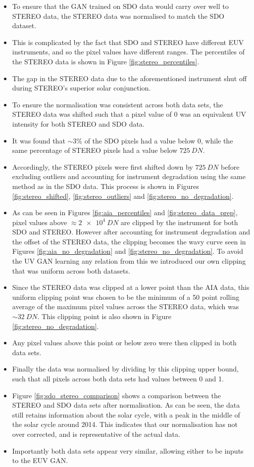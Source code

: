 \documentclass[11pt,a4paper,onecolumn]{report}
\begin{document}
\begin{itemize}
  \item To ensure that the GAN trained on SDO data would carry over well to
  STEREO data, the STEREO data was normalised to match the SDO dataset.
  \item This is complicated by the fact that SDO and STEREO have different EUV
  instruments, and so the pixel values have different ranges. The percentiles of
  the STEREO data is shown in Figure \ref{fig:stereo_percentiles}.
  \item The gap in the STEREO data due to the aforementioned instrument shut off
  during STEREO's superior solar conjunction.
  \item To ensure the normalisation was consistent across both data sets,
  the STEREO data was shifted such that a pixel value of 0 was an equivalent UV
  intensity for both STEREO and SDO data.
  \item It was found that $\sim 3 \%$ of the SDO pixels had a value below 0,
  while the same percentage of STEREO pixels had a value below $\SI[]{725}[]{DN}$.
  \item Accordingly, the STEREO pixels were first shifted down by
  $\SI[]{725}[]{DN}$ before excluding outliers and accounting for instrument
  degradation using the same method as in the SDO data. This process is shown in
  Figures \ref{fig:stereo_shifted}, \ref{fig:stereo_outliers} and
  \ref{fig:stereo_no_degradation}.
  \item As can be seen in Figures \ref{fig:aia_percentiles} and
  \ref{fig:stereo_data_prep}, pixel values above $\approx \SI[]{2e4}[]{DN}$ are
  clipped by the instrument for both SDO and STEREO. However after accounting
  for instrument degradation and the offset of the STEREO data, the clipping
  becomes the wavy curve seen in Figures \ref{fig:aia_no_degradation} and
  \ref{fig:stereo_no_degradation}. To avoid the UV GAN learning any relation from
  this we introduced our own clipping that was uniform across both datasets.
  \item Since the STEREO data was clipped at a lower point than the AIA data,
  this uniform clipping point was chosen to be the minimum of a 50 point rolling
  average of the maximum pixel values across the STEREO data, which was $\sim \SI[]{32}[]{DN}$. This clipping
  point is also shown in Figure \ref{fig:stereo_no_degradation}.
  \item Any pixel values above this point or below zero were then clipped in both data sets.
  \item Finally the data was normalised by dividing by this clipping upper
  bound, such that all pixels across both data sets had values between 0 and 1.
  \item Figure \ref{fig:sdo_stereo_comparison} shows a comparison between the
  STEREO and SDO data sets after normalisation. As can be seen, the data still
  retains information about the solar cycle, with a peak in the middle of the
  solar cycle around 2014. This indicates that our normalisation has not over
  corrected, and is representative of the actual data. %
  \item Importantly both data sets appear very similar, allowing either to be
  inputs to the EUV GAN.
\end{itemize}
\end{document}
